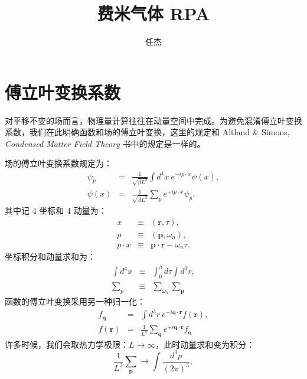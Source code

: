 \documentclass[10pt,UTF8]{ctexart}
\begin{document}
\title{费米气体 RPA}
\date{任杰}

\maketitle


\section*{傅立叶变换系数}
\noindent
对平移不变的场而言，物理量计算往往在动量空间中完成。为避免混淆傅立叶变换系数，我们在此明确函数和场的傅立叶变换，这里的规定和 Altland \& Simons, \textit{Condensed Matter Field Theory} 书中的规定是一样的。

场的傅立叶变换系数规定为：
\begin{eqnarray}
	\psi_{p} & = & \frac{1}{\sqrt{\beta L^3}}\int d^4 x\ e^{-ip\cdot x}\psi(x),\\
	\psi(x) & = & \frac{1}{\sqrt{\beta L^3}} \sum_{p} e^{+ip\cdot x}\psi_{p}.
\end{eqnarray}
其中记 4 坐标和 4 动量为：
\begin{eqnarray}
	x & \equiv & (\bm r,\tau), \\
	p & \equiv & (\bm p,\omega_n), \\
	p\cdot x & \equiv & \bm p\cdot \bm r - \omega_n \tau.
\end{eqnarray}
坐标积分和动量求和为：
\begin{eqnarray}
	\int d^4 x &\equiv & \int_0^\beta d\tau \int d^3 r, \\
	\sum_p &\equiv & \sum_{\omega_n}\sum_{\bm p}
\end{eqnarray}
函数的傅立叶变换采用另一种归一化：
\begin{eqnarray}
	f_{\bm q} & = & \int d^3 r\ e^{-i\bm{q}\cdot\bm{r}}f\left(\bm{r}\right),\\
	f(\bm r) & = & \frac{1}{L^3} \sum_{\bm q} e^{+i\bm q\cdot\bm r}f_{\bm q}
\end{eqnarray}
许多时候，我们会取热力学极限：$L\rightarrow \infty$，此时动量求和变为积分：
\begin{equation}
	\frac{1}{L^3} \sum_{\bm p}\longrightarrow \int\frac{d^3 p}{\left(2\pi\right)^3},
\end{equation}
\end{document}
